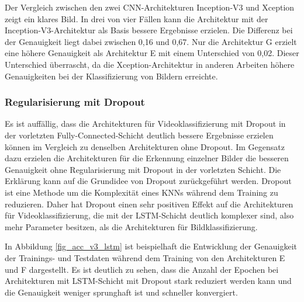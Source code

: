Der Vergleich zwischen den zwei \ac{CNN}-Architekturen Inception-V3 und Xception zeigt ein klares Bild. In drei von vier Fällen kann die Architektur mit der Inception-V3-Architektur als Basis bessere Ergebnisse erzielen. Die Differenz bei der Genauigkeit liegt dabei zwischen 0,16 und 0,67. Nur die Architektur G erzielt eine höhere Genauigkeit als Architektur E mit einem Unterschied von 0,02. Dieser Unterschied überrascht, da die Xception-Architektur in anderen Arbeiten \cite{chollet2017xception} höhere Genauigkeiten bei der Klassifizierung von Bildern erreichte.

\subsubsection{Regularisierung mit Dropout}

Es ist auffällig, dass die Architekturen für Videoklassifizierung mit Dropout in der vorletzten Fully-Connected-Schicht deutlich bessere Ergebnisse erzielen können im Vergleich zu denselben Architekturen ohne Dropout. Im Gegensatz dazu erzielen die Architekturen für die Erkennung einzelner Bilder die besseren Genauigkeit ohne Regularisierung mit Dropout in der vorletzten Schicht. Die Erklärung kann auf die Grundidee von Dropout zurückgeführt werden. Dropout ist eine Methode um die Komplexität eines \acp{KNN} während dem Training zu reduzieren. Daher hat Dropout einen sehr positiven Effekt auf die Architekturen für Videoklassifizierung, die mit der \ac{LSTM}-Schicht deutlich komplexer sind, also mehr Parameter besitzen, als die Architekturen für Bildklassifizierung.

In Abbildung \ref{fig_acc_v3_lstm} ist beispielhaft die Entwicklung der Genauigkeit der Trainings- und Testdaten während dem Training von den Architekturen E und F dargestellt. Es ist deutlich zu sehen, dass die Anzahl der Epochen bei Architekturen mit \ac{LSTM}-Schicht mit Dropout stark reduziert werden kann und die Genauigkeit weniger sprunghaft ist und schneller konvergiert.

